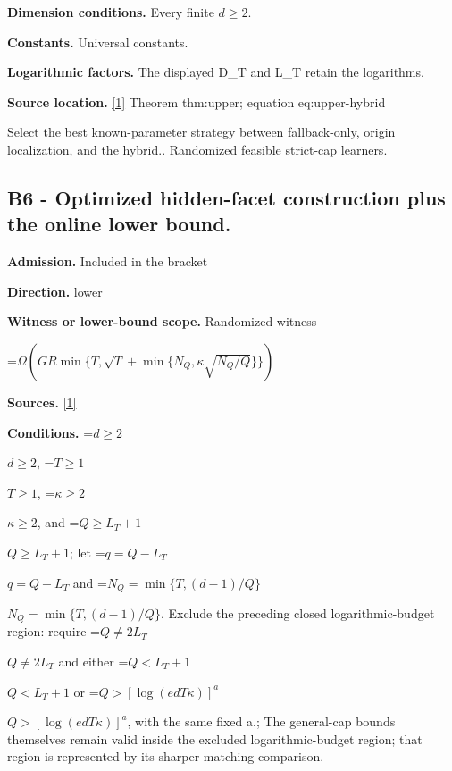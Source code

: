 \documentclass[10pt,a4paper]{article}
\newcommand{\AtlasMath}[1]{\par\begingroup\centering\setbox0=\hbox{$\displaystyle #1$}\ifdim\wd0>1.4\linewidth\typeout{ATLAS WIDE FORMULA: \the\wd0}\fi\ifdim\wd0>\linewidth\resizebox{\linewidth}{!}{\box0}\else\box0\fi\par\endgroup}
\newcommand{\AtlasInlineMath}[1]{\begingroup\setbox0=\hbox{$#1$}\ifdim\wd0>.4\linewidth\endgroup\AtlasMath{#1}\else\endgroup$#1$\fi}
\begin{document}
\textbf{Dimension conditions.} Every finite $d\ge 2$.



\textbf{Constants.} Universal constants.



\textbf{Logarithmic factors.} The displayed D\_T and L\_T retain the logarithms.



\textbf{Source location.} \href{https://github.com/WU-Wendao/Colombo/blob/main/colombo_sensorium/Complexity_altas/data/sources/colombo/U08/manuscript.pdf}{[1]} Theorem thm:upper; equation eq:upper-hybrid



Select the best known-parameter strategy between fallback-only, origin localization, and the hybrid.. Randomized feasible strict-cap learners.



\subsection{B6 - Optimized hidden-facet construction plus the online lower bound.}


\textbf{Admission.} Included in the bracket



\textbf{Direction.} lower



\textbf{Witness or lower-bound scope.} Randomized witness



\AtlasMath{\Omega\!\left(GR\min\{T,\sqrt T+\min\{N_Q,\kappa\sqrt{N_Q/Q}\}\}\right)}


\textbf{Sources.} \href{https://github.com/WU-Wendao/Colombo/blob/main/colombo_sensorium/Complexity_altas/data/sources/colombo/U08/manuscript.pdf}{[1]}



\textbf{Conditions.} \AtlasInlineMath{d\ge2}, \AtlasInlineMath{T\ge1}, \AtlasInlineMath{\kappa\ge2}, and \AtlasInlineMath{Q\ge L_T+1}; let \AtlasInlineMath{q=Q-L_T} and \AtlasInlineMath{N_Q=\min\{T,(d-1)/Q\}}. Exclude the preceding closed logarithmic-budget region: require \AtlasInlineMath{Q\ne2L_T} and either \AtlasInlineMath{Q<L_T+1} or \AtlasInlineMath{Q>[\log(edT\kappa)]^a}, with the same fixed a.; The general-cap bounds themselves remain valid inside the excluded logarithmic-budget region; that region is represented by its sharper matching comparison.
\end{document}
